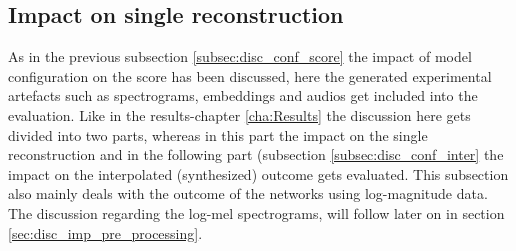 \subsection{Impact on single reconstruction}
\label{subsec:disc_conf_single_rec}
As in the previous subsection \ref{subsec:disc_conf_score} the impact of model configuration on the score has been discussed, here the generated experimental artefacts such as spectrograms, embeddings and audios get included into the evaluation. Like in the results-chapter \ref{cha:Results} the discussion here gets divided into two parts, whereas in this part the impact on the single reconstruction and in the following part (subsection \ref{subsec:disc_conf_inter} the impact on the interpolated (synthesized) outcome gets evaluated. 
This subsection also mainly deals with the outcome of the networks using log-magnitude data. The discussion regarding the log-mel spectrograms, will follow later on in section \ref{sec:disc_imp_pre_processing}.


